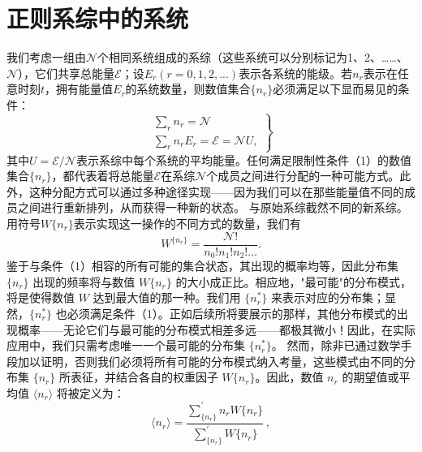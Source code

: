 \section{正则系综中的系统}\label{ux5e38ux89c4ux7cfbux7efcux4e2dux7684ux7cfbux7edf}
我们考虑一组由\(\mathcal{N}\)个相同系统组成的系综（这些系统可以分别标记为1、2、\ldots\ldots、\(\mathcal{N}\)），它们共享总能量\(\mathcal{E}\)；设\(E_{r}(r=0,1,2,...)\)表示各系统的能级。若\(n_{r}\)表示在任意时刻\(t\)，拥有能量值\(E_{r}\)的系统数量，则数值集合\(\{n_{r}\}\)必须满足以下显而易见的条件：
\begin{equation}\tag{3.2.1}\label{eq:3.2.1}
\left. \begin{array}{l} { { \displaystyle \sum _ { r } n _ { r } = \mathcal { N } } } \\{ { \displaystyle \sum _ { r } n _ { r } E _ { r } = \mathcal { E } = \mathcal { N } U , } } \end{array} \right\}
\end{equation}
其中\(U=\mathcal{E}/\mathcal{N}\)表示系综中每个系统的平均能量。任何满足限制性条件（1）的数值集合\(\{n_{r}\}\)，都代表着将总能量\(\mathcal{E}\)在系综\(\mathcal{N}\)个成员之间进行分配的一种可能方式。此外，这种分配方式可以通过多种途径实现——因为我们可以在那些能量值不同的成员之间进行重新排列，从而获得一种新的状态。
与原始系综截然不同的新系综。用符号\(W\{n_r\}\)表示实现这一操作的不同方式的数量，我们有
\begin{equation}\tag{3.2.2}\label{eq:3.2.2}
W ^{\{ n _ { r} \} } = \frac { \mathcal { N } ! } { n _ { 0 } ! n _ { 1 } ! n _ { 2 } ! \ldots } .
\end{equation}
鉴于与条件（1）相容的所有可能的集合状态，其出现的概率均等，因此分布集 \(\{n_r\}\) 出现的频率将与数值 \(W\{n_r\}\) 的大小成正比。相应地，"最可能"的分布模式，将是使得数值 \(W\) 达到最大值的那一种。我们用 \(\{n_r^*\}\) 来表示对应的分布集；显然，\(\{n_r^*\}\) 也必须满足条件（1）。正如后续所将要展示的那样，其他分布模式的出现概率——无论它们与最可能的分布模式相差多远——都极其微小！因此，在实际应用中，我们只需考虑唯一一个最可能的分布集 \(\{n_r^*\}\)。
然而，除非已通过数学手段加以证明，否则我们必须将所有可能的分布模式纳入考量，这些模式由不同的分布集 \(\{n_r\}\) 所表征，并结合各自的权重因子 \(W\{n_r\}\)。因此，数值 \(n_r\) 的期望值或平均值 \(\langle n_r \rangle\) 将被定义为：
\begin{equation}\tag{3.2.3}\label{eq:3.2.3}
\langle n _ { r } \rangle = \frac { \sum _ { \{ n _ { r } \} } ^{\prime} n _ { r } W \{ n _ { r } \} } { \sum _ { \{ n _ { r } \} } ^{\prime} W \{ n _ { r } \} } \, ,
\end{equation}

